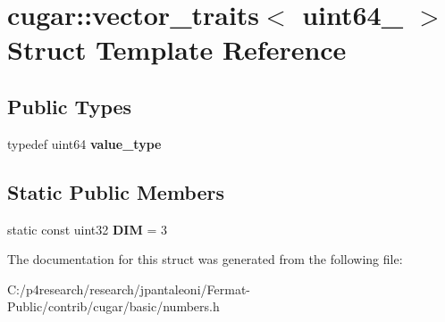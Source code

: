 \hypertarget{structcugar_1_1vector__traits_3_01uint64__3_01_4}{}\section{cugar\+:\+:vector\+\_\+traits$<$ uint64\+\_ $>$ Struct Template Reference}
\label{structcugar_1_1vector__traits_3_01uint64__3_01_4}
\subsection*{Public Types}
\begin{DoxyCompactItemize}
\item 
\mbox{\label{structcugar_1_1vector__traits_3_01uint64__3_01_4_a5f5145d0039ecaa9b4dd8bc8f95e229c}} 
typedef uint64 {\bfseries value\+\_\+type}
\end{DoxyCompactItemize}
\subsection*{Static Public Members}
\begin{DoxyCompactItemize}
\item 
\mbox{\label{structcugar_1_1vector__traits_3_01uint64__3_01_4_a54241954b629f65be41f53c2e4b72999}} 
static const uint32 {\bfseries D\+IM} = 3
\end{DoxyCompactItemize}


The documentation for this struct was generated from the following file\+:\begin{DoxyCompactItemize}
\item 
C\+:/p4research/research/jpantaleoni/\+Fermat-\/\+Public/contrib/cugar/basic/numbers.\+h\end{DoxyCompactItemize}
